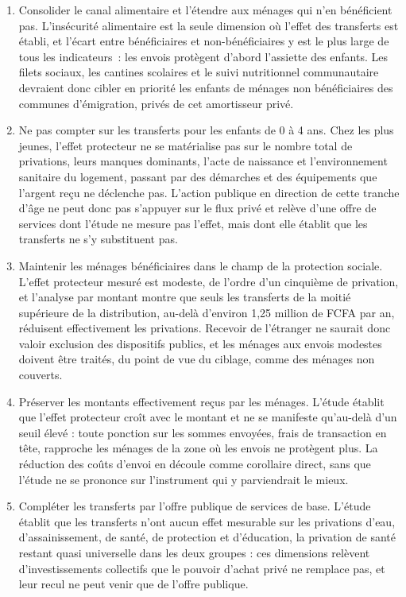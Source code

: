 \begin{enumerate}
  \item Consolider le canal alimentaire et l'étendre aux ménages qui
        n'en bénéficient pas. L'insécurité alimentaire est la seule
        dimension où l'effet des transferts est établi, et l'écart entre
        bénéficiaires et non-bénéficiaires y est le plus large de tous
        les indicateurs~: les envois protègent d'abord l'assiette des
        enfants. Les filets sociaux, les cantines scolaires et le suivi
        nutritionnel communautaire devraient donc cibler en priorité les
        enfants de ménages non bénéficiaires des communes d'émigration,
        privés de cet amortisseur privé.

  \item Ne pas compter sur les transferts pour les enfants de 0 à 4
        ans. Chez les plus jeunes, l'effet protecteur ne se matérialise
        pas sur le nombre total de privations, leurs manques dominants,
        l'acte de naissance et l'environnement sanitaire du logement,
        passant par des démarches et des équipements que l'argent reçu ne
        déclenche pas. L'action publique en direction de cette tranche
        d'âge ne peut donc pas s'appuyer sur le flux privé et relève
        d'une offre de services dont l'étude ne mesure pas l'effet, mais
        dont elle établit que les transferts ne s'y substituent pas.

  \item Maintenir les ménages bénéficiaires dans le champ de la
        protection sociale. L'effet protecteur mesuré est modeste, de
        l'ordre d'un cinquième de privation, et l'analyse par montant
        montre que seuls les transferts de la moitié supérieure de la
        distribution, au-delà d'environ 1,25 million de FCFA par an,
        réduisent effectivement les privations. Recevoir de l'étranger ne
        saurait donc valoir exclusion des dispositifs publics, et les
        ménages aux envois modestes doivent être traités, du point de vue
        du ciblage, comme des ménages non couverts.

  \item Préserver les montants effectivement reçus par les ménages.
        L'étude établit que l'effet protecteur croît avec le montant et
        ne se manifeste qu'au-delà d'un seuil élevé : toute ponction sur
        les sommes envoyées, frais de transaction en tête, rapproche les
        ménages de la zone où les envois ne protègent plus. La réduction
        des coûts d'envoi en découle comme corollaire direct, sans que
        l'étude ne se prononce sur l'instrument qui y parviendrait le
        mieux.

  \item Compléter les transferts par l'offre publique de services de
        base. L'étude établit que les transferts n'ont aucun effet
        mesurable sur les privations d'eau, d'assainissement, de santé,
        de protection et d'éducation, la privation de santé restant
        quasi universelle dans les deux groupes : ces dimensions
        relèvent d'investissements collectifs que le pouvoir d'achat
        privé ne remplace pas, et leur recul ne peut venir que de
        l'offre publique.
\end{enumerate}

